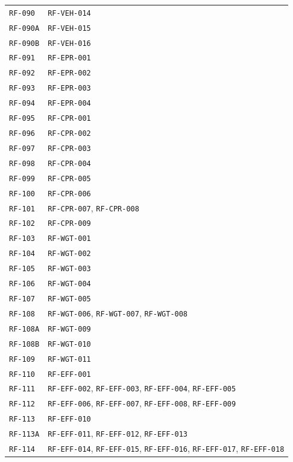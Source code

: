 \documentclass[10pt,letterpaper]{article}
\begin{document}
\begin{longtable}{P{3.0cm}P{10.6cm}}
\texttt{RF-090} & \texttt{RF-VEH-014}\\
\texttt{RF-090A} & \texttt{RF-VEH-015}\\
\texttt{RF-090B} & \texttt{RF-VEH-016}\\
\texttt{RF-091} & \texttt{RF-EPR-001}\\
\texttt{RF-092} & \texttt{RF-EPR-002}\\
\texttt{RF-093} & \texttt{RF-EPR-003}\\
\texttt{RF-094} & \texttt{RF-EPR-004}\\
\texttt{RF-095} & \texttt{RF-CPR-001}\\
\texttt{RF-096} & \texttt{RF-CPR-002}\\
\texttt{RF-097} & \texttt{RF-CPR-003}\\
\texttt{RF-098} & \texttt{RF-CPR-004}\\
\texttt{RF-099} & \texttt{RF-CPR-005}\\
\texttt{RF-100} & \texttt{RF-CPR-006}\\
\texttt{RF-101} & \texttt{RF-CPR-007}, \texttt{RF-CPR-008}\\
\texttt{RF-102} & \texttt{RF-CPR-009}\\
\texttt{RF-103} & \texttt{RF-WGT-001}\\
\texttt{RF-104} & \texttt{RF-WGT-002}\\
\texttt{RF-105} & \texttt{RF-WGT-003}\\
\texttt{RF-106} & \texttt{RF-WGT-004}\\
\texttt{RF-107} & \texttt{RF-WGT-005}\\
\texttt{RF-108} & \texttt{RF-WGT-006}, \texttt{RF-WGT-007}, \texttt{RF-WGT-008}\\
\texttt{RF-108A} & \texttt{RF-WGT-009}\\
\texttt{RF-108B} & \texttt{RF-WGT-010}\\
\texttt{RF-109} & \texttt{RF-WGT-011}\\
\texttt{RF-110} & \texttt{RF-EFF-001}\\
\texttt{RF-111} & \texttt{RF-EFF-002}, \texttt{RF-EFF-003}, \texttt{RF-EFF-004}, \texttt{RF-EFF-005}\\
\texttt{RF-112} & \texttt{RF-EFF-006}, \texttt{RF-EFF-007}, \texttt{RF-EFF-008}, \texttt{RF-EFF-009}\\
\texttt{RF-113} & \texttt{RF-EFF-010}\\
\texttt{RF-113A} & \texttt{RF-EFF-011}, \texttt{RF-EFF-012}, \texttt{RF-EFF-013}\\
\texttt{RF-114} & \texttt{RF-EFF-014}, \texttt{RF-EFF-015}, \texttt{RF-EFF-016}, \texttt{RF-EFF-017}, \texttt{RF-EFF-018}\\

\end{longtable}
\end{document}
